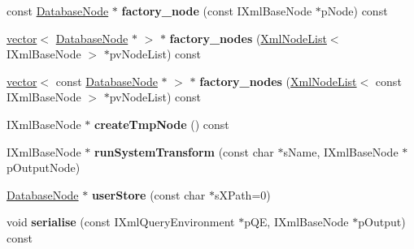 \begin{DoxyCompactItemize}
\item 
\hypertarget{classgeneral__server_1_1Database_a89b037f9249cb08ce318b1678d627141}{const \hyperlink{classgeneral__server_1_1DatabaseNode}{\-Database\-Node} $\ast$ {\bfseries factory\-\_\-node} (const \-I\-Xml\-Base\-Node $\ast$p\-Node) const }\label{classgeneral__server_1_1Database_a89b037f9249cb08ce318b1678d627141}

\item 
\hypertarget{classgeneral__server_1_1Database_a0ff0bceaccdfd7957425d45569dc1d61}{\hyperlink{classvector}{vector}$<$ \hyperlink{classgeneral__server_1_1DatabaseNode}{\-Database\-Node} $\ast$ $>$ $\ast$ {\bfseries factory\-\_\-nodes} (\hyperlink{classgeneral__server_1_1XmlNodeList}{\-Xml\-Node\-List}$<$ \-I\-Xml\-Base\-Node $>$ $\ast$pv\-Node\-List) const }\label{classgeneral__server_1_1Database_a0ff0bceaccdfd7957425d45569dc1d61}

\item 
\hypertarget{classgeneral__server_1_1Database_ade21c4dbdc60b1353f2844e17982591e}{\hyperlink{classvector}{vector}$<$ const \hyperlink{classgeneral__server_1_1DatabaseNode}{\-Database\-Node} $\ast$ $>$ $\ast$ {\bfseries factory\-\_\-nodes} (\hyperlink{classgeneral__server_1_1XmlNodeList}{\-Xml\-Node\-List}$<$ const \-I\-Xml\-Base\-Node $>$ $\ast$pv\-Node\-List) const }\label{classgeneral__server_1_1Database_ade21c4dbdc60b1353f2844e17982591e}

\item 
\hypertarget{classgeneral__server_1_1Database_a3cae1c5cdd9fd0c8ae27535f2ac2cd50}{\-I\-Xml\-Base\-Node $\ast$ {\bfseries create\-Tmp\-Node} () const }\label{classgeneral__server_1_1Database_a3cae1c5cdd9fd0c8ae27535f2ac2cd50}

\item 
\hypertarget{classgeneral__server_1_1Database_a10c0e164f2b67f141953f4de4c050d26}{\-I\-Xml\-Base\-Node $\ast$ {\bfseries run\-System\-Transform} (const char $\ast$s\-Name, \-I\-Xml\-Base\-Node $\ast$p\-Output\-Node)}\label{classgeneral__server_1_1Database_a10c0e164f2b67f141953f4de4c050d26}

\item 
\hypertarget{classgeneral__server_1_1Database_ae500ef2db3b7c12bfa9317c723db4ef7}{\hyperlink{classgeneral__server_1_1DatabaseNode}{\-Database\-Node} $\ast$ {\bfseries user\-Store} (const char $\ast$s\-X\-Path=0)}\label{classgeneral__server_1_1Database_ae500ef2db3b7c12bfa9317c723db4ef7}

\item 
\hypertarget{classgeneral__server_1_1Database_a529f486cfe16764c02cb76ea0c286c95}{void {\bfseries serialise} (const \-I\-Xml\-Query\-Environment $\ast$p\-Q\-E, \-I\-Xml\-Base\-Node $\ast$p\-Output) const }\label{classgeneral__server_1_1Database_a529f486cfe16764c02cb76ea0c286c95}


\end{DoxyCompactItemize}
